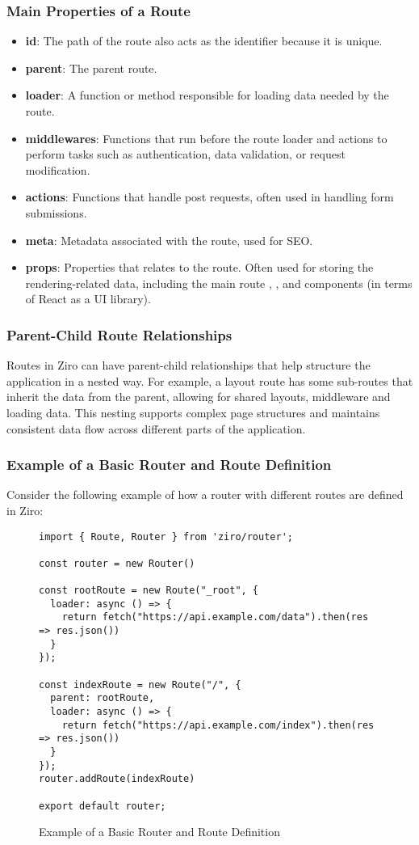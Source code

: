 \subsubsection{Main Properties of a Route}
\begin{itemize}
	\item \textbf{id}: The path of the route also acts as the identifier because it is unique.
	\item \textbf{parent}: The parent route.
	\item \textbf{loader}: A function or method responsible for loading data needed by the route.
	\item \textbf{middlewares}: Functions that run before the route loader and actions to perform tasks such as authentication, data validation, or request modification.
	\item \textbf{actions}: Functions that handle post requests, often used in handling form submissions.
	\item \textbf{meta}: Metadata associated with the route, used for SEO.
	\item \textbf{props}: Properties that relates to the route. Often used for storing the rendering-related data, including the main route , , and  components (in terms of React as a UI library).
\end{itemize}

\subsubsection{Parent-Child Route Relationships}
Routes in Ziro can have parent-child relationships that help structure the application in a nested way. For example, a layout route has some sub-routes that inherit the data from the parent, allowing for shared layouts, middleware and loading data. This nesting supports complex page structures and maintains consistent data flow across different parts of the application.

\pagebreak

\subsubsection{Example of a Basic Router and Route Definition}
Consider the following example of how a router with different routes are defined in Ziro:

\begin{figure}[h!]
\begin{verbatim}
import { Route, Router } from 'ziro/router';

const router = new Router()

const rootRoute = new Route("_root", {
  loader: async () => {
    return fetch("https://api.example.com/data").then(res => res.json())
  }
});

const indexRoute = new Route("/", {
  parent: rootRoute,
  loader: async () => {
    return fetch("https://api.example.com/index").then(res => res.json())
  }
});
router.addRoute(indexRoute)

export default router;
\end{verbatim}
\caption{Example of a Basic Router and Route Definition}
\end{figure}

